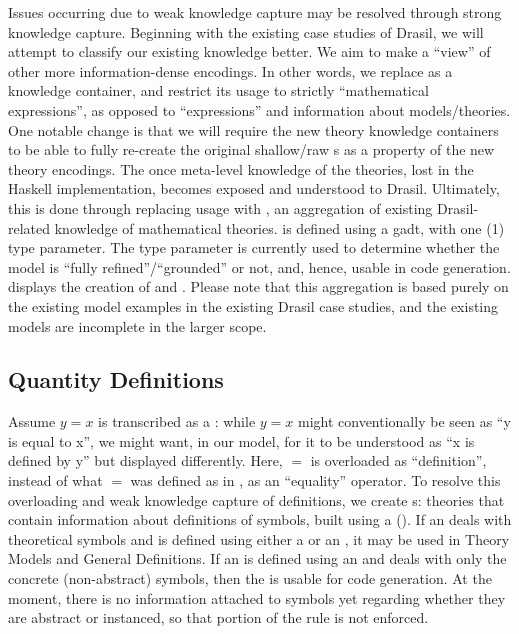 Issues occurring due to weak knowledge capture may be resolved through strong
knowledge capture. Beginning with the existing case studies of Drasil, we will
attempt to classify our existing knowledge better. We aim to make
\RelationConcept{} a ``view'' of other more information-dense encodings. In
other words, we replace \Expr{} as a knowledge container, and restrict its usage
to strictly ``mathematical expressions'', as opposed to ``expressions'' and
information about models/theories. One notable change is that we will require
the new theory knowledge containers to be able to fully re-create the original
shallow/raw \Expr{}s as a property of the new theory encodings. The once
meta-level knowledge of the theories, lost in the Haskell implementation,
becomes exposed and understood to Drasil. Ultimately, this is done through
replacing \RelationConcept{} usage with \ModelKind{}, an aggregation of existing
Drasil-related knowledge of mathematical theories. \ModelKind{} is defined using
a \acs{gadt}, with one (1) type parameter. The type parameter is currently used
to determine whether the model is ``fully refined''/``grounded'' or not, and,
hence, usable in code generation.  displays the
creation of \ModelKind{} and \ModelKinds{}. Please note that this aggregation is
based purely on the existing model examples in the existing Drasil case studies,
and the existing models are incomplete in the larger scope.


\currentModelKindsHaskell{}

\subsection{Quantity Definitions}

\currentQDefinitionHaskell{}

Assume \(y = x\) is transcribed as a \RelationConcept{}: while \(y = x\) might
conventionally be seen as ``y is equal to x'', we might want, in our model, for
it to be understood as ``x is defined by y'' but displayed differently. Here,
\(=\) is overloaded as ``definition'', instead of what \(=\) was defined as in
\Expr{}, as an ``equality'' operator. To resolve this overloading and weak
knowledge capture of definitions, we create \EquationalModel{}s: theories that
contain information about definitions of symbols, built using a \QDefinition{}
(). If an \EquationalModel{} deals with
theoretical symbols and is defined using either a \ModelExpr{} or an \Expr{}, it
may be used in Theory Models and General Definitions. If an \EquationalModel{}
is defined using an \Expr{} and deals with only the concrete (non-abstract)
symbols, then the \EquationalModel{} is usable for code generation. At the
moment, there is no information attached to symbols yet regarding whether they
are abstract or instanced, so that portion of the rule is not enforced.

